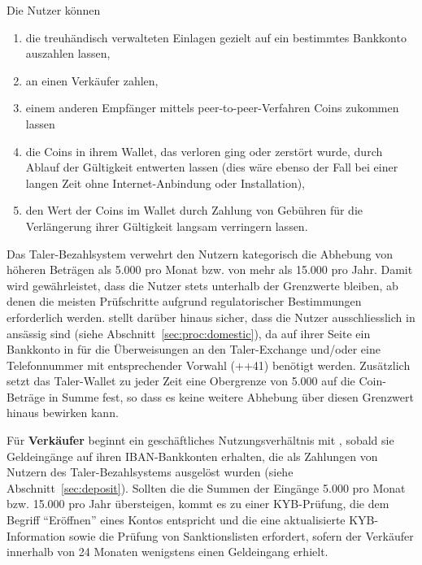 \documentclass[10pt,a4paper,oneside]{book}
\begin{document}
Die Nutzer k\"onnen
\begin{enumerate}[noitemsep]
\item die treuh\"andisch verwalteten Einlagen gezielt auf ein bestimmtes
Bankkonto auszahlen lassen,
\item an einen Verk\"aufer zahlen,
\item einem anderen Empf\"anger mittels peer-to-peer-Verfahren Coins zukommen
lassen
\item die Coins in ihrem Wallet, das verloren ging oder zerst\"ort wurde,
durch Ablauf der G\"ultigkeit entwerten lassen (dies w\"are ebenso der Fall
bei einer langen Zeit ohne Internet-Anbindung oder Installation),
\item den Wert der Coins im Wallet durch Zahlung von Geb\"uhren f\"ur
die Verl\"angerung ihrer G\"ultigkeit langsam verringern lassen.
\end{enumerate}

Das Taler-Bezahlsystem verwehrt den Nutzern kategorisch die Abhebung
von h\"oheren Betr\"agen als 5.000 \CURRENCY{} pro Monat bzw. von
mehr als 15.000 \CURRENCY{} pro Jahr. Damit wird gew\"ahrleistet,
dass die Nutzer stets unterhalb der Grenzwerte bleiben, ab denen die
meisten Pr\"ufschritte aufgrund regulatorischer Bestimmungen erforderlich
werden. \TALER{} stellt dar\"uber hinaus sicher, dass die Nutzer
ausschliesslich in \LAND{} ans\"assig sind
(siehe Abschnitt~\ref{sec:proc:domestic}), da auf ihrer Seite ein Bankkonto
in \LAND{} f\"ur die \"Uberweisungen an den Taler-Exchange und/oder
eine Telefonnummer mit entsprechender Vorwahl (++41) ben\"otigt werden.
Zus\"atzlich setzt das Taler-Wallet zu jeder Zeit eine Obergrenze
von 5.000 \CURRENCY{} auf die Coin-Betr\"age in Summe fest, so dass es
keine weitere Abhebung \"uber diesen Grenzwert hinaus bewirken kann.

F\"ur {\bf Verk\"aufer} beginnt ein gesch\"aftliches Nutzungsverh\"altnis
mit \TALER{}, sobald sie Geldeing\"ange auf ihren IBAN-Bankkonten erhalten,
die als Zahlungen von Nutzern des Taler-Bezahlsystems ausgel\"ost wurden
(siehe Abschnitt~\ref{sec:deposit}). Sollten die die Summen der Eing\"ange
5.000 \CURRENCY{} pro Monat bzw. 15.000 \CURRENCY{} pro Jahr \"ubersteigen,
kommt es zu einer KYB-Pr\"ufung, die dem Begriff ``Er\"offnen'' eines
Kontos entspricht und die eine aktualisierte KYB-Information sowie
die Pr\"ufung von Sanktionslisten erfordert, sofern der Verk\"aufer
innerhalb von 24 Monaten wenigstens einen Geldeingang erhielt.
\end{document}
